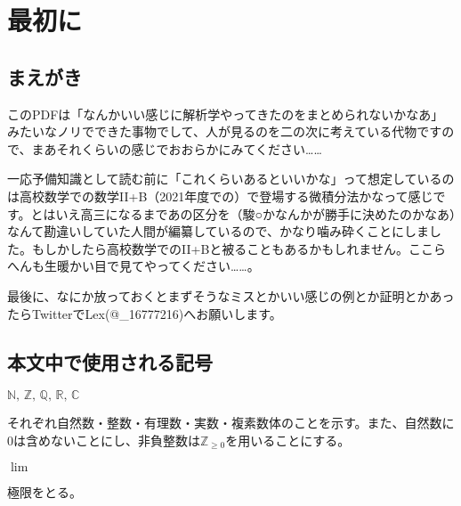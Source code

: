 \chapter{最初に}
\section*{まえがき}
このPDFは「なんかいい感じに解析学やってきたのをまとめられないかなあ」みたいなノリでできた事物でして、人が見るのを二の次に考えている代物ですので、まあそれくらいの感じでおおらかにみてください……

一応予備知識として読む前に「これくらいあるといいかな」って想定しているのは高校数学での数学II+B（2021年度での）で登場する微積分法かなって感じです。とはいえ高三になるまであの区分を（駿○かなんかが勝手に決めたのかなあ）なんて勘違いしていた人間が編纂しているので、かなり噛み砕くことにしました。もしかしたら高校数学でのII+Bと被ることもあるかもしれません。ここらへんも生暖かい目で見てやってください……。

最後に、なにか放っておくとまずそうなミスとかいい感じの例とか証明とかあったらTwitterでLex(@\_16777216)へお願いします。
\section*{本文中で使用される記号}
$\mathbb{N},\,\mathbb{Z},\,\mathbb{Q},\,\mathbb{R},\,\mathbb{C}$

それぞれ自然数・整数・有理数・実数・複素数体のことを示す。また、自然数に0は含めないことにし、非負整数は$\mathbb{Z}_{\geq 0}$を用いることにする。

$\lim$

極限をとる。